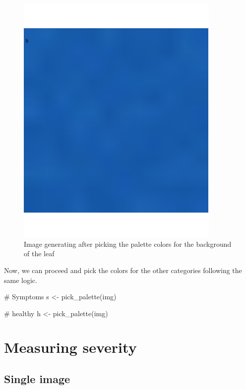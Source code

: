 \documentclass[
  letterpaper,
]{book}
\newenvironment{Shaded}{\begin{snugshade}}{\end{snugshade}}
\newcommand{\CommentTok}[1]{\textcolor[rgb]{0.37,0.37,0.37}{#1}}
\newcommand{\FunctionTok}[1]{\textcolor[rgb]{0.28,0.35,0.67}{#1}}
\newcommand{\NormalTok}[1]{\textcolor[rgb]{0.00,0.23,0.31}{#1}}
\newcommand{\OtherTok}[1]{\textcolor[rgb]{0.00,0.23,0.31}{#1}}
\begin{document}
\begin{figure}

{\centering \includegraphics[width=3.875in,height=\textheight]{imgs/b_picked.png}

}

\caption{Image generating after picking the palette colors for the
background of the leaf}

\end{figure}

Now, we can proceed and pick the colors for the other categories
following the same logic.

\begin{Shaded}
\begin{Highlighting}[]
\CommentTok{\# Symptoms}
\NormalTok{s }\OtherTok{\textless{}{-}} \FunctionTok{pick\_palette}\NormalTok{(img)}

\CommentTok{\# healthy}
\NormalTok{h }\OtherTok{\textless{}{-}} \FunctionTok{pick\_palette}\NormalTok{(img)}
\end{Highlighting}
\end{Shaded}

\hypertarget{measuring-severity}{%
\section{Measuring severity}\label{measuring-severity}}

\hypertarget{single-image}{%
\subsection{Single image}\label{single-image}}
\end{document}
